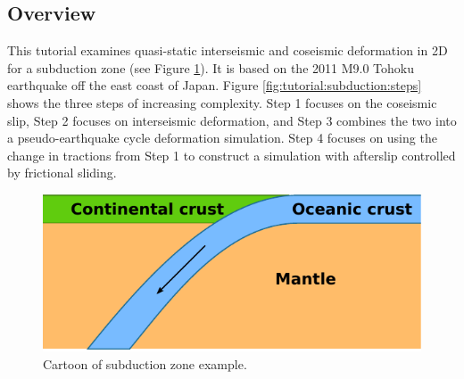 \subsection{Overview}

This tutorial examines quasi-static interseismic and coseismic deformation
in 2D for a subduction zone (see Figure \ref{fig:tutorial:subduction:overview}).
It is based on the 2011 M9.0 Tohoku earthquake off the east coast
of Japan. Figure \ref{fig:tutorial:subduction:steps} shows the three
steps of increasing complexity. Step 1 focuses on the coseismic slip,
Step 2 focuses on interseismic deformation, and Step 3 combines the
two into a pseudo-earthquake cycle deformation simulation. Step 4
focuses on using the change in tractions from Step 1 to construct
a simulation with afterslip controlled by frictional sliding.

\begin{figure}
\begin{centering}
\includegraphics{tutorials/subduction/figs/cartoon_general}
\par\end{centering}

\caption{Cartoon of subduction zone example.\label{fig:tutorial:subduction:overview}}
\end{figure}



